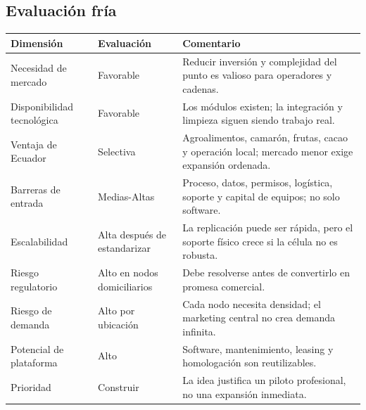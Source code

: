 \documentclass[11pt,a4paper]{article}
\begin{document}
\subsection{Evaluación fría}
{\small
\begin{xltabular}{\textwidth}{@{}P{3.6cm}P{3.4cm}L@{}}
\toprule
\textbf{Dimensión} & \textbf{Evaluación} & \textbf{Comentario}\\ \midrule
\endhead
Necesidad de mercado & Favorable & Reducir inversión y complejidad del punto es valioso para operadores y cadenas.\\
Disponibilidad tecnológica & Favorable & Los módulos existen; la integración y limpieza siguen siendo trabajo real.\\
Ventaja de Ecuador & Selectiva & Agroalimentos, camarón, frutas, cacao y operación local; mercado menor exige expansión ordenada.\\
Barreras de entrada & Medias-Altas & Proceso, datos, permisos, logística, soporte y capital de equipos; no solo software.\\
Escalabilidad & Alta después de estandarizar & La replicación puede ser rápida, pero el soporte físico crece si la célula no es robusta.\\
Riesgo regulatorio & Alto en nodos domiciliarios & Debe resolverse antes de convertirlo en promesa comercial.\\
Riesgo de demanda & Alto por ubicación & Cada nodo necesita densidad; el marketing central no crea demanda infinita.\\
Potencial de plataforma & Alto & Software, mantenimiento, leasing y homologación son reutilizables.\\
Prioridad & Construir & La idea justifica un piloto profesional, no una expansión inmediata.\\
\bottomrule
\end{xltabular}}
\end{document}
